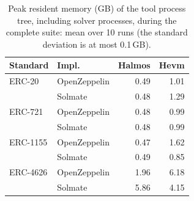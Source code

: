 \begin{table}[htbp]
\centering
\begin{scriptsize}
\begin{tabular}{llrr}
\toprule
\textbf{Standard} & \textbf{Impl.} & \textbf{Halmos} & \textbf{Hevm} \\
\midrule
ERC-20 & OpenZeppelin & 0.49 & 1.01 \\
 & Solmate & 0.48 & 1.29 \\
\addlinespace
ERC-721 & OpenZeppelin & 0.48 & 0.99 \\
 & Solmate & 0.48 & 0.99 \\
\addlinespace
ERC-1155 & OpenZeppelin & 0.47 & 1.62 \\
 & Solmate & 0.49 & 0.85 \\
\addlinespace
ERC-4626 & OpenZeppelin & 1.96 & 6.18 \\
 & Solmate & 5.86 & 4.15 \\
\bottomrule
\end{tabular}
\end{scriptsize}
\caption{Peak resident memory (GB) of the tool process tree, including solver processes, during the complete suite: mean over 10 runs (the standard deviation is at most 0.1\,GB).}
\label{tab:memory}
\end{table}

